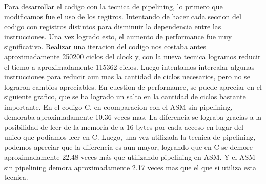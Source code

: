 
Para desarrollar el codigo con la tecnica de pipelining, lo primero que modificamos fue el uso de los regitros. Intentando de hacer cada seccion del codigo con registros distintos para disminuir la dependencia entre las instrucciones. Una vez logrado esto, el aumento de performance fue muy significativo. Realizar una iteracion del codigo nos costaba antes aproximadamente 250200 ciclos del clock y, con la nueva tecnica logramos reducir el tiemo a aproximadamente 115362 ciclos.
\newline
Luego intentamos intercalar algunas instrucciones para reducir aun mas la cantidad de ciclos necesarios, pero no se lograron cambios apreciables.
\newline
\newline
En cuestion de performance, se puede apreciar en el siguiente grafico, que se ha logrado un salto en la cantidad de ciclos bastante importante. En el codigo C, en coomparacion con el ASM sin pipelining, demoraba aproximadamente 10.36 veces mas. La diferencia se lograba gracias a la posibilidad de leer de la memoria de a 16 bytes por cada acceso en lugar del unico que podiamos leer en C. Luego, una vez utilizada la tecnica de pipelining, podemos apreciar que la diferencia es aun mayor, logrando que en C se demore aproximadamente 22.48 veces más que utilizando pipelining en ASM. Y el ASM sin pipelining demora aproximadamente 2.17 veces mas que el que si utiliza esta tecnica.
\newline


